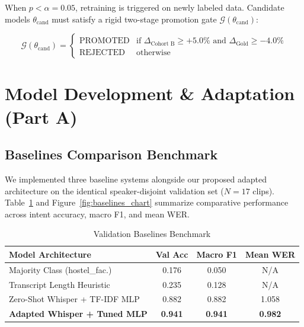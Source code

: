 \documentclass[sigconf,authordraft]{acmart}
\begin{document}
When $p < \alpha = 0.05$, retraining is triggered on newly labeled data. Candidate models
$\theta_{\text{cand}}$ must satisfy a rigid two-stage promotion gate $\mathcal{G}(\theta_{\text{cand}})$:

\begin{equation}
  \mathcal{G}(\theta_{\text{cand}}) = \begin{cases}
    \text{PROMOTED} & \text{if } \Delta_{\text{Cohort B}} \ge +5.0\% \text{ and } \Delta_{\text{Gold}} \ge -4.0\% \\
    \text{REJECTED} & \text{otherwise}
  \end{cases}
  \label{eq:gate}
\end{equation}

\section{Model Development & Adaptation (Part A)}
\label{sec:model}

\subsection{Baselines Comparison Benchmark}

We implemented three baseline systems alongside our proposed adapted architecture on the identical
speaker-disjoint validation set ($N = 17$ clips). Table~\ref{tab:baselines} and Figure~\ref{fig:baselines_chart}
summarize comparative performance across intent accuracy, macro F1, and mean WER.

\begin{table}[h]
  \caption{Validation Baselines Benchmark}
  \label{tab:baselines}
  \centering
  \small
  \begin{tabular}{lccc}
    \toprule
    \textbf{Model Architecture} & \textbf{Val Acc} & \textbf{Macro F1} & \textbf{Mean WER} \\
    \midrule
    Majority Class (hostel\_fac.) & 0.176 & 0.050 & N/A \\
    Transcript Length Heuristic & 0.235 & 0.128 & N/A \\
    Zero-Shot Whisper + TF-IDF MLP & 0.882 & 0.882 & 1.058 \\
    \textbf{Adapted Whisper + Tuned MLP} & \textbf{0.941} & \textbf{0.941} & \textbf{0.982} \\
    \bottomrule
  \end{tabular}
\end{table}
\end{document}
